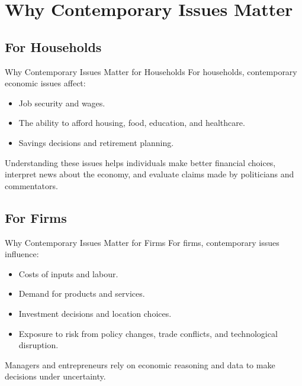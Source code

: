 \documentclass[aspectratio=169]{beamer}
\begin{document}
\section{Why Contemporary Issues Matter}

\subsection{For Households}

\begin{frame}{Why Contemporary Issues Matter for Households}
  \transfade
  For households, contemporary economic issues affect:
  \begin{itemize}[<+->]
    \item Job security and wages.
    \item The ability to afford housing, food, education, and healthcare.
    \item Savings decisions and retirement planning.
  \end{itemize}

  \vspace{0.3cm}
  Understanding these issues helps individuals make better financial choices, interpret news
  about the economy, and evaluate claims made by politicians and commentators.
\end{frame}

\subsection{For Firms}

\begin{frame}{Why Contemporary Issues Matter for Firms}
  \transfade
  For firms, contemporary issues influence:
  \begin{itemize}[<+->]
    \item Costs of inputs and labour.
    \item Demand for products and services.
    \item Investment decisions and location choices.
    \item Exposure to risk from policy changes, trade conflicts, and technological disruption.
  \end{itemize}

  \vspace{0.3cm}
  Managers and entrepreneurs rely on economic reasoning and data to make decisions under
  uncertainty.
\end{frame}
\end{document}
